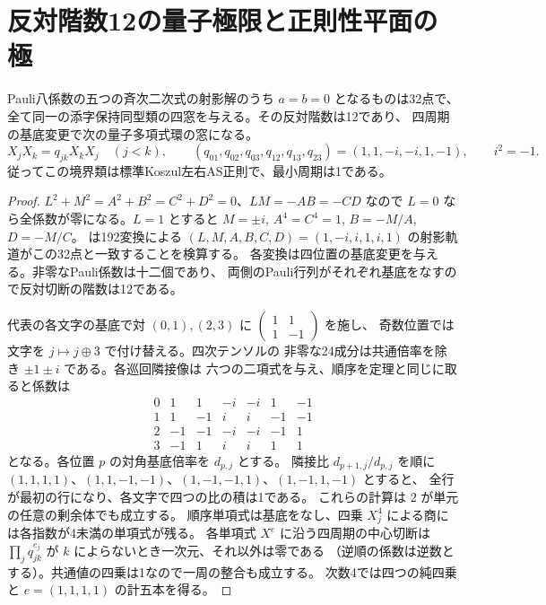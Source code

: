 \section{反対階数12の量子極限と正則性平面の極}
\label{sec:rank-twelve-quantum-limit}
\begin{theorem}\label{thm:rank-twelve-quantum-limit}
Pauli八係数の五つの斉次二次式の射影解のうち $a=b=0$ となるものは32点で、
全て同一の添字保持同型類の四窓を与える。その反対階数は12であり、
四周期の基底変更で次の量子多項式環の窓になる。
\[
 X_jX_k=q_{jk}X_kX_j\quad(j<k),\qquad
 (q_{01},q_{02},q_{03},q_{12},q_{13},q_{23})=(1,1,-i,-i,1,-1),
 \qquad i^2=-1 .
\]
従ってこの境界類は標準Koszul左右AS正則で、最小周期は1である。
\end{theorem}
\begin{proof}
$L^2+M^2=A^2+B^2=C^2+D^2=0$、$LM=-AB=-CD$ なので
$L=0$ なら全係数が零になる。$L=1$ とすると
$M=\pm i$, $A^4=C^4=1$, $B=-M/A$, $D=-M/C$。
 は192変換による
$(L,M,A,B,C,D)=(1,-i,i,1,i,1)$ の射影軌道がこの32点と一致することを検算する。
各変換は四位置の基底変更を与える。非零なPauli係数は十二個であり、
両側のPauli行列がそれぞれ基底をなすので反対切断の階数は12である。

代表の各文字の基底で対 $(0,1),(2,3)$ に
$\left(\begin{smallmatrix}1&1\\1&-1\end{smallmatrix}\right)$ を施し、
奇数位置では文字を $j\mapsto j\oplus3$ で付け替える。四次テンソルの
非零な24成分は共通倍率を除き $\pm1\pm i$ である。各巡回隣接像は
六つの二項式を与え、順序を定理と同じに取ると係数は
\[
\begin{array}{c|rrrrrr}
0&1&1&-i&-i&1&-1\\
1&1&-1&i&i&-1&-1\\
2&-1&-1&-i&-i&-1&1\\
3&-1&1&i&i&1&1
\end{array}
\]
となる。各位置 $p$ の対角基底倍率を $d_{p,j}$ とする。
隣接比 $d_{p+1,j}/d_{p,j}$ を順に
$(1,1,1,1)$、$(1,1,-1,-1)$、$(1,-1,-1,1)$、$(1,-1,1,-1)$ とすると、
全行が最初の行になり、各文字で四つの比の積は1である。
これらの計算は $2$ が単元の任意の剰余体でも成立する。
順序単項式は基底をなし、四乗 $X_j^4$ による商には各指数が4未満の単項式が残る。
各単項式 $X^e$ に沿う四周期の中心切断は
$\prod_j q_{jk}^{e_j}$ が $k$ によらないとき一次元、それ以外は零である
（逆順の係数は逆数とする）。共通値の四乗は1なので一周の整合も成立する。
次数4では四つの純四乗と $e=(1,1,1,1)$ の計五本を得る。
\end{proof}

